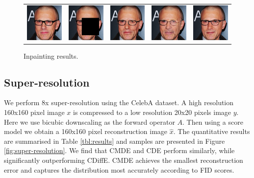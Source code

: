 \begin{figure}
\begin{center}
\begin{tabular}{ccccc}
      \includegraphics[width=.15\textwidth]{Chapter2/samples/inpainting/table/3/x.png} &   
      \includegraphics[width=.15\textwidth]{Chapter2/samples/inpainting/table/3/y.png} &
      \includegraphics[width=.15\textwidth]{Chapter2/samples/inpainting/table/3/sr3.png} & 
      \includegraphics[width=.15\textwidth]{Chapter2/samples/inpainting/table/3/Song.png} & 
      \includegraphics[width=.15\textwidth]{Chapter2/samples/inpainting/table/3/DV.png} \\
  \end{tabular}
  \endgroup
  \end{center}
  \caption{Inpainting results.}
  \label{fig:inpainting}
\end{figure}


\subsection{Super-resolution}
We perform 8x super-resolution using the CelebA dataset. A high resolution 160x160 pixel image $x$ is compressed to a low resolution 20x20 pixels image $y$. Here we use bicubic downscaling \cite{keyes1981bicubic} as the forward operator  $A$. Then using a score model we obtain a 160x160 pixel reconstruction image $\hat{x}$. The quantitative results are summarised in Table \ref{tbl:results} and samples are presented in Figure \ref{fig:super-resolution}. We find that CMDE and CDE perform similarly, while significantly outperforming CDiffE. CMDE achieves the smallest reconstruction error and captures the distribution most accurately according to FID scores. 



